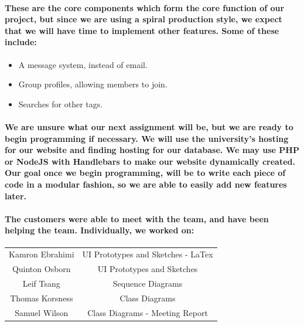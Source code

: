 \documentclass[12pt]{articlei}
\begin{document}
  \paragraph{\normalfont \indent These are the core components which form the core function of our project, but since we are using a spiral production style, we expect that we will have time to implement other features. Some of these include:
  }
   \begin{itemize}
    \item A message system, instead of email.
    \item Group profiles, allowing members to join.
    \item Searches for other tags.
   \end{itemize}

  \paragraph{\normalfont \indent We are unsure what our next assignment will be, but we are ready to begin programming if necessary. We will use the university’s hosting for our website and finding hosting for our database. We may use PHP or NodeJS with Handlebars to make our website dynamically created. Our goal once we begin programming, will be to write each piece of code in a modular fashion, so we are able to easily add new features later.
  }

  \paragraph{\normalfont \indent The customers were able to meet with the team, and have been helping the team. Individually, we worked on:
  }

\begin{center}
\begin{tabular}{ |c|c| }
 \hline
 Kamron Ebrahimi & UI Prototypes and Sketches - LaTex \\
 Quinton Osborn & UI Prototypes and Sketches \\
 Leif Tsang & Sequence Diagrams \\
 Thomas Korsness & Class Diagrams \\
 Samuel Wilson & Class Diagrams - Meeting Report \\
 \hline
\end{tabular}
\end{center}
\end{document}
